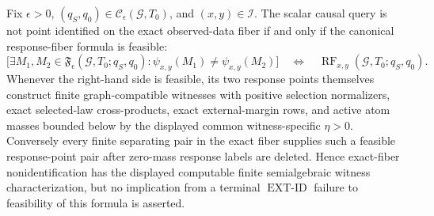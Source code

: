 Fix \(\epsilon>0\), \((q_S,q_0)\in\mathcal C_{\epsilon}(\mathcal G,T_0)\), and \((x,y)\in\mathcal I\).  The scalar causal query is not point identified on the exact observed-data fiber if and only if the canonical response-fiber formula is feasible:
\[
 \bigl[\exists M_1,M_2\in\mathfrak F_{\epsilon}(\mathcal G,T_0;q_S,q_0):
 \psi_{x,y}(M_1)\neq\psi_{x,y}(M_2)\bigr]
 \quad\Longleftrightarrow\quad
 \operatorname{RF}_{x,y}(\mathcal G,T_0;q_S,q_0).
\]
Whenever the right-hand side is feasible, its two response points themselves construct finite graph-compatible witnesses with positive selection normalizers, exact selected-law cross-products, exact external-margin rows, and active atom masses bounded below by the displayed common witness-specific \(\eta>0\).  Conversely every finite separating pair in the exact fiber supplies such a feasible response-point pair after zero-mass response labels are deleted.  Hence exact-fiber nonidentification has the displayed computable finite semialgebraic witness characterization, but no implication from a terminal \(\operatorname{EXT\text{-}ID}\) failure to feasibility of this formula is asserted.